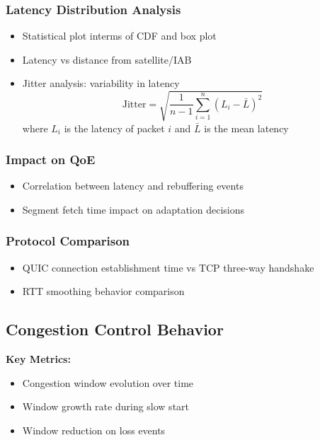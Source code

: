 \documentclass[11pt,a4paper]{article}
\begin{document}
\subsubsection{Latency Distribution Analysis}
\begin{itemize}
    \item Statistical plot interms of CDF and box plot
    \item Latency vs distance from satellite/IAB
    \item Jitter analysis: variability in latency
        \begin{equation}
            \text{Jitter} = \sqrt{\frac{1}{n-1}\sum_{i=1}^{n}(L_i - \bar{L})^2}
        \end{equation}
        where $L_i$ is the latency of packet $i$ and $\bar{L}$ is the mean latency
\end{itemize}

\subsubsection{Impact on QoE}
\begin{itemize}
    \item Correlation between latency and rebuffering events
    \item Segment fetch time impact on adaptation decisions
\end{itemize}

\subsubsection{Protocol Comparison}
\begin{itemize}
    \item QUIC connection establishment time vs TCP three-way handshake
    \item RTT smoothing behavior comparison
\end{itemize}

\subsection{Congestion Control Behavior}
\textbf{Key Metrics:}
\begin{itemize}
    \item Congestion window evolution over time
    \item Window growth rate during slow start
    \item Window reduction on loss events
\end{itemize}
\end{document}
